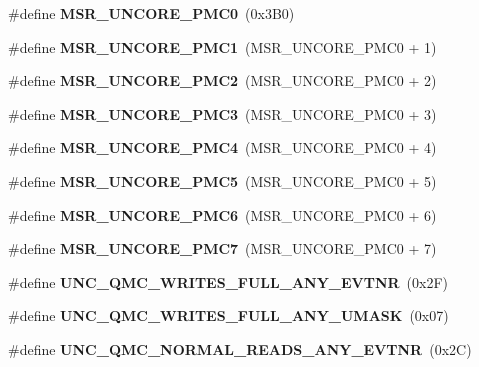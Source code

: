 \begin{DoxyCompactItemize}
\item 
\mbox{\label{types_8h_a592a3e5afd79812513acf908d7ae0d8a}} 
\#define {\bfseries M\+S\+R\+\_\+\+U\+N\+C\+O\+R\+E\+\_\+\+P\+M\+C0}~(0x3\+B0)
\item 
\mbox{\label{types_8h_a717e98a8854f396ed8babb52ed62b94c}} 
\#define {\bfseries M\+S\+R\+\_\+\+U\+N\+C\+O\+R\+E\+\_\+\+P\+M\+C1}~(M\+S\+R\+\_\+\+U\+N\+C\+O\+R\+E\+\_\+\+P\+M\+C0 + 1)
\item 
\mbox{\label{types_8h_aca5d029ab6db9be41c3c2f8b87dd2349}} 
\#define {\bfseries M\+S\+R\+\_\+\+U\+N\+C\+O\+R\+E\+\_\+\+P\+M\+C2}~(M\+S\+R\+\_\+\+U\+N\+C\+O\+R\+E\+\_\+\+P\+M\+C0 + 2)
\item 
\mbox{\label{types_8h_aa24f97a63a98e8c679d63337b7d1f189}} 
\#define {\bfseries M\+S\+R\+\_\+\+U\+N\+C\+O\+R\+E\+\_\+\+P\+M\+C3}~(M\+S\+R\+\_\+\+U\+N\+C\+O\+R\+E\+\_\+\+P\+M\+C0 + 3)
\item 
\mbox{\label{types_8h_aa8da504c3306853bbc38d19b192bd871}} 
\#define {\bfseries M\+S\+R\+\_\+\+U\+N\+C\+O\+R\+E\+\_\+\+P\+M\+C4}~(M\+S\+R\+\_\+\+U\+N\+C\+O\+R\+E\+\_\+\+P\+M\+C0 + 4)
\item 
\mbox{\label{types_8h_a0feaf89fcc2184adf2fdf25f7b91a4ef}} 
\#define {\bfseries M\+S\+R\+\_\+\+U\+N\+C\+O\+R\+E\+\_\+\+P\+M\+C5}~(M\+S\+R\+\_\+\+U\+N\+C\+O\+R\+E\+\_\+\+P\+M\+C0 + 5)
\item 
\mbox{\label{types_8h_ad6eb53ff302cbe4e49539f0dcd2732d4}} 
\#define {\bfseries M\+S\+R\+\_\+\+U\+N\+C\+O\+R\+E\+\_\+\+P\+M\+C6}~(M\+S\+R\+\_\+\+U\+N\+C\+O\+R\+E\+\_\+\+P\+M\+C0 + 6)
\item 
\mbox{\label{types_8h_a1c7b14ded17a8e1a216c908b5f6f84b7}} 
\#define {\bfseries M\+S\+R\+\_\+\+U\+N\+C\+O\+R\+E\+\_\+\+P\+M\+C7}~(M\+S\+R\+\_\+\+U\+N\+C\+O\+R\+E\+\_\+\+P\+M\+C0 + 7)
\item 
\mbox{\label{types_8h_a4f51d39c0b2c93cc8b109a94e6314118}} 
\#define {\bfseries U\+N\+C\+\_\+\+Q\+M\+C\+\_\+\+W\+R\+I\+T\+E\+S\+\_\+\+F\+U\+L\+L\+\_\+\+A\+N\+Y\+\_\+\+E\+V\+T\+NR}~(0x2\+F)
\item 
\mbox{\label{types_8h_a9dd4b0b4cf1bb831b9e34773c59dbeed}} 
\#define {\bfseries U\+N\+C\+\_\+\+Q\+M\+C\+\_\+\+W\+R\+I\+T\+E\+S\+\_\+\+F\+U\+L\+L\+\_\+\+A\+N\+Y\+\_\+\+U\+M\+A\+SK}~(0x07)
\item 
\mbox{\label{types_8h_a097baf5419e07e930219946420c0e257}} 
\#define {\bfseries U\+N\+C\+\_\+\+Q\+M\+C\+\_\+\+N\+O\+R\+M\+A\+L\+\_\+\+R\+E\+A\+D\+S\+\_\+\+A\+N\+Y\+\_\+\+E\+V\+T\+NR}~(0x2\+C)
\item 
\mbox{\label{types_8h_a386070eca92af21fadab353ab255fe75}} 

\end{DoxyCompactItemize}
